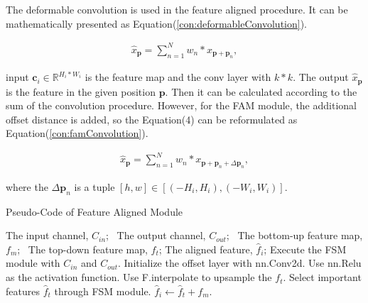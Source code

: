 The deformable convolution is used in the feature aligned procedure. It can be mathematically presented as Equation(\ref{con:deformableConvolution}).



\begin{equation}
    \begin{aligned}
    \hat{x}_\textbf{p}= \sum_{n = 1}^{N}w_n * x_{\textbf{p}+\textbf{p}_n},
    \label{con:deformableConvolution}
    \end{aligned}
\end{equation}

input $\textbf{c}_i \in \mathbb{R}^{H_i * W_i}$ is the feature map and the conv layer with $k * k$. The output $\hat{x}_\textbf{p}$ is the feature in the given position $\textbf{p}$. Then it can be calculated according to the sum of the convolution procedure. However, for the FAM module, the additional offset distance is added, so the Equation(4) can be reformulated as Equation(\ref{con:famConvolution}).

\begin{equation}
    \begin{aligned}
    \hat{x}_\textbf{p}= \sum_{n = 1}^{N}w_n * x_{\textbf{p}+\textbf{p}_n+\Delta\textbf{p}_n},
    \label{con:famConvolution}
    \end{aligned}
\end{equation}

where the $\Delta\textbf{p}_n$ is a tuple $[h, w] \in [(-H_i, H_i), (-W_i, W_i)]$.

\begin{algorithm}[htbp]
	\caption{Pseudo-Code of Feature Aligned Module} 
	\label{alg1} 
	\begin{algorithmic}
		\REQUIRE 
        The input channel, $C_{in}$;
		\ The output channel, $C_{out}$;
		\ The bottom-up feature map, $f_m$;
		\ The top-down feature map, $f_t$;
		\ENSURE 
        The aligned feature, $\hat{f}_i$;
		\STATE Execute the FSM module with $C_{in}$ and $C_{out}$.
		\STATE Initialize the offset layer with nn.Conv2d.
		\STATE Use nn.Relu as the activation function.
        \STATE Use F.interpolate to upsample the $f_t$.
		\ENDIF 
		\STATE Select important features $\hat{f}_t$ through FSM module.
		\STATE $\hat{f}_i \gets \hat{f}_t + f_m$.

	\end{algorithmic} 
\end{algorithm}


